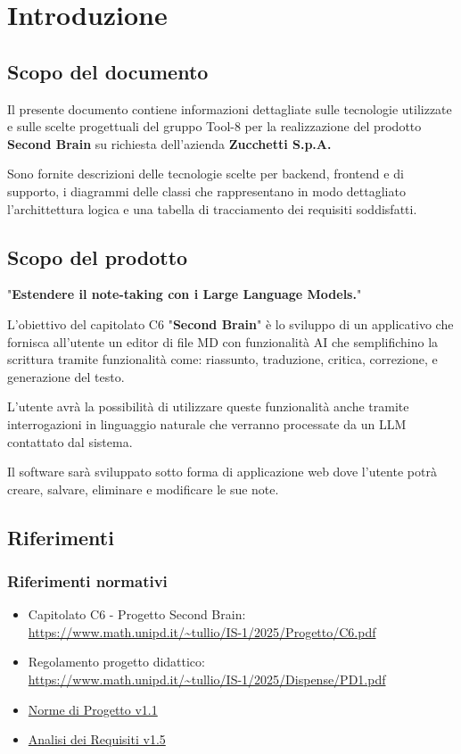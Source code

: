 \documentclass[a4paper,10pt]{article}
\begin{document}
\newpage

\listoffigures

\newpage

\section{Introduzione}
\subsection{Scopo del documento}
Il presente documento contiene informazioni dettagliate sulle tecnologie utilizzate e sulle scelte progettuali del gruppo Tool-8 per la realizzazione del prodotto \textbf{Second Brain} su richiesta dell'azienda \textbf{Zucchetti S.p.A.}

Sono fornite descrizioni delle tecnologie scelte per backend, frontend e di supporto, i diagrammi delle classi che rappresentano in modo dettagliato l'archittettura logica e una tabella di tracciamento dei requisiti soddisfatti.

\subsection{Scopo del prodotto}
"\textbf{Estendere il note-taking con i Large Language Models.}"

L'obiettivo del capitolato C6 "\textbf{Second Brain}" è lo sviluppo di un applicativo che fornisca all'utente un editor di file MD con funzionalità AI che semplifichino la scrittura tramite funzionalità come: riassunto, traduzione, critica, correzione, e generazione del testo.

L'utente avrà la possibilità di utilizzare queste funzionalità anche tramite interrogazioni in linguaggio naturale che verranno processate da un LLM contattato dal sistema.

Il software sarà sviluppato sotto forma di applicazione web dove l'utente potrà creare, salvare, eliminare e modificare le sue note.

\subsection{Riferimenti}
\subsubsection{Riferimenti normativi}
\begin{itemize}
  \item Capitolato C6 - Progetto Second Brain: \\  \url{https://www.math.unipd.it/~tullio/IS-1/2025/Progetto/C6.pdf}
  \item Regolamento progetto didattico: \\ \url{https://www.math.unipd.it/~tullio/IS-1/2025/Dispense/PD1.pdf}
  \item \href{https://tool-8.github.io/Documentazione-SWE/pb/Norme_di_Progetto_v1.1.pdf}{Norme di Progetto v1.1}
  \item \href{https://tool-8.github.io/Documentazione-SWE/pb/Analisi_dei_Requisiti_v1.5.pdf}{Analisi dei Requisiti v1.5}
\end{itemize}
\end{document}
